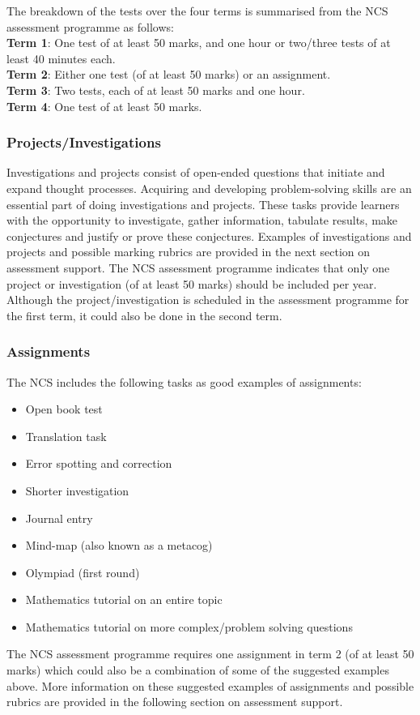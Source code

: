 The breakdown of the tests over the four terms is summarised from the NCS assessment programme as follows: \\
\textbf{Term 1}:	One test of at least 50 marks, and one hour or two/three tests of at least 40 minutes each.\\
\textbf{Term 2}:	Either one test (of at least 50 marks) or an assignment.\\
\textbf{Term 3}:	Two tests, each of at least 50 marks and one hour.\\
\textbf{Term 4}:	One test of at least 50 marks.\\

\subsubsection{Projects/Investigations}

Investigations and projects consist of open-ended questions that initiate and expand thought processes. Acquiring and developing problem-solving skills are an essential part of doing investigations and projects. These tasks provide learners with the opportunity to investigate, gather information, tabulate results, make conjectures and justify or prove these conjectures.  Examples of investigations and projects and possible marking rubrics are provided in the next section on assessment support. The NCS assessment programme indicates that only one project or investigation (of at least 50 marks) should be included per year. Although the project/investigation is scheduled in the assessment programme for the first term, it could also be done in the second term. 
\subsubsection{Assignments}
The NCS includes the following tasks as good examples of assignments: 
\begin{itemize}[noitemsep]
\item Open book test
\item Translation task
\item Error spotting and correction
\item Shorter investigation
\item Journal entry
\item Mind-map (also known as a metacog)
\item Olympiad (first round)
\item Mathematics tutorial on an entire topic
\item Mathematics tutorial on more complex/problem solving questions
\end{itemize}
The NCS assessment programme requires one assignment in term 2 (of at least 50 marks) which could also be a combination of some of the suggested examples above. More information on these suggested examples of assignments and possible rubrics are provided in the following section on assessment support. 

